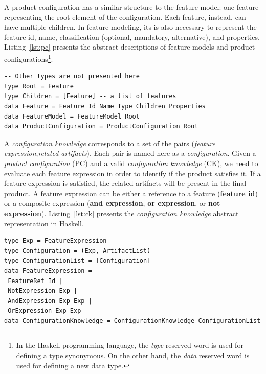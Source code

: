\documentclass{acm_proc_article-sp}
\begin{document}
A product configuration has a similar structure to the feature model:
one feature representing the root element of the configuration. Each
feature, instead, can have multiple children. In feature modeling,
its is also necessary to represent the feature id, name,
classification (optional, mandatory, alternative), and properties.
Listing~\ref{lst:pc} presents the abstract descriptions of feature models 
and product configurations\footnote{In the Haskell programming language, the
\emph{type} reserved word is used for defining a type synonymous. On
the other hand, the \emph{data }reserved word is used for defining a
new data type.}.

\begin{lstlisting}[belowskip=20pt,frame=tb,caption={Product Configuration},label=lst:pc]
-- Other types are not presented here
type Root = Feature
type Children = [Feature] -- a list of features
data Feature = Feature Id Name Type Children Properties
data FeatureModel = FeatureModel Root
data ProductConfiguration = ProductConfiguration Root
\end{lstlisting}

A \emph{configuration knowledge} corresponds 
to a set of the pairs (\emph{feature expression},\emph{related artifacts}). 
Each pair is named here as a \emph{configuration}. Given a
\emph{product configuration} (PC) and a valid \emph{configuration
knowledge} (CK), we need to evaluate each feature expression in
order to identify if the product satisfies it. If a feature
expression is satisfied, the related artifacts will be present in the
final product. A feature expression can be either a reference to a
feature ({\bf feature id}) or a composite expression ({\bf and expression}, 
{\bf or expression}, or {\bf not expression}). Listing~\ref{lst:ck}
presents the \emph{configuration knowledge} abstract representation in Haskell.

\begin{lstlisting}[belowskip=20pt,frame=tb,caption={Configuration Knowledge},label=lst:ck]
type Exp = FeatureExpression
type Configuration = (Exp, ArtifactList)
type ConfigurationList = [Configuration]
data FeatureExpression =
 FeatureRef Id |
 NotExpression Exp |
 AndExpression Exp Exp |
 OrExpression Exp Exp
data ConfigurationKnowledge = ConfigurationKnowledge ConfigurationList
\end{lstlisting}
\end{document}
